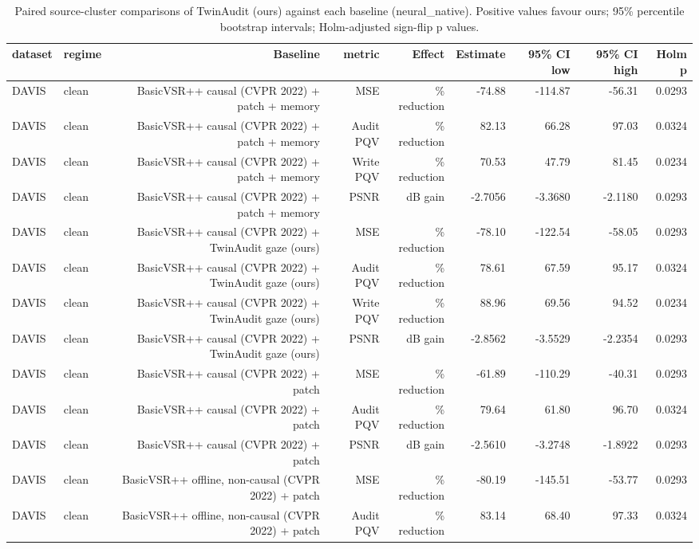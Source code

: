 \begin{table}[t]
\centering
\caption{Paired source-cluster comparisons of TwinAudit (ours) against each baseline (neural\_native). Positive values favour ours; 95\% percentile bootstrap intervals; Holm-adjusted sign-flip p values.}
\label{tab:paired_neural_native}
\small
\begin{tabular}{llrrrrrrr}
\toprule
dataset & regime & Baseline & metric & Effect & Estimate & 95\% CI low & 95\% CI high & Holm p \\
\midrule
DAVIS & clean & BasicVSR++ causal (CVPR 2022) + patch + memory & MSE & \% reduction & -74.88 & -114.87 & -56.31 & 0.0293 \\
DAVIS & clean & BasicVSR++ causal (CVPR 2022) + patch + memory & Audit PQV & \% reduction & 82.13 & 66.28 & 97.03 & 0.0324 \\
DAVIS & clean & BasicVSR++ causal (CVPR 2022) + patch + memory & Write PQV & \% reduction & 70.53 & 47.79 & 81.45 & 0.0234 \\
DAVIS & clean & BasicVSR++ causal (CVPR 2022) + patch + memory & PSNR & dB gain & -2.7056 & -3.3680 & -2.1180 & 0.0293 \\
DAVIS & clean & BasicVSR++ causal (CVPR 2022) + TwinAudit gaze (ours) & MSE & \% reduction & -78.10 & -122.54 & -58.05 & 0.0293 \\
DAVIS & clean & BasicVSR++ causal (CVPR 2022) + TwinAudit gaze (ours) & Audit PQV & \% reduction & 78.61 & 67.59 & 95.17 & 0.0324 \\
DAVIS & clean & BasicVSR++ causal (CVPR 2022) + TwinAudit gaze (ours) & Write PQV & \% reduction & 88.96 & 69.56 & 94.52 & 0.0234 \\
DAVIS & clean & BasicVSR++ causal (CVPR 2022) + TwinAudit gaze (ours) & PSNR & dB gain & -2.8562 & -3.5529 & -2.2354 & 0.0293 \\
DAVIS & clean & BasicVSR++ causal (CVPR 2022) + patch & MSE & \% reduction & -61.89 & -110.29 & -40.31 & 0.0293 \\
DAVIS & clean & BasicVSR++ causal (CVPR 2022) + patch & Audit PQV & \% reduction & 79.64 & 61.80 & 96.70 & 0.0324 \\
DAVIS & clean & BasicVSR++ causal (CVPR 2022) + patch & PSNR & dB gain & -2.5610 & -3.2748 & -1.8922 & 0.0293 \\
DAVIS & clean & BasicVSR++ offline, non-causal (CVPR 2022) + patch & MSE & \% reduction & -80.19 & -145.51 & -53.77 & 0.0293 \\
DAVIS & clean & BasicVSR++ offline, non-causal (CVPR 2022) + patch & Audit PQV & \% reduction & 83.14 & 68.40 & 97.33 & 0.0324 \\

\end{tabular}
\end{table}

